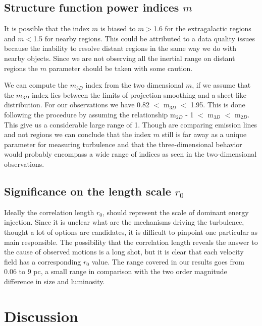 \documentclass[fleqn,usenatbib, useAMS, a4paper]{mnras}
\begin{document}
\subsection{Structure function power indices \(m\)}

It is possible that the index \(m\) is biased to \(m>\)1.6 for the extragalactic regions and \(m<\)1.5 for nearby regions.
This could be attributed to a data quality issues because the inability to resolve distant regions in the same way we do with nearby objects.
Since we are not observing all the inertial range on distant regions the \(m\) parameter  should be taken with some caution.

We can compute the $m_{3D}$ index from the two dimensional \(m\), if we assume that the $m_{3D}$ index lies between the limits of projection smoothing and a sheet-like distribution. 
For our observations we have 0.82 $<$ m$_{3D}$ $<$ 1.95.
This is done following the procedure by \cite{arthur2016turbulence} assuming the relationship m$_{2D}$ - 1 $<$ m$_{3D}$ $<$ m$_{2D}$.
This give us a considerable large range of 1. 
Though \cite{arthur2016turbulence} are comparing emission lines and not regions we can conclude that the index \(m\) still is far away as a unique parameter for measuring turbulence and that the three-dimensional behavior would probably encompass a wide range of indices as seen in the two-dimensional observations.


\subsection{Significance on the length scale \(r_0\)}

Ideally the correlation length \(r_0\), should represent the scale of dominant energy injection. 
Since it is unclear what are the mechanisms driving the turbulence, thought a lot of options are candidates, it is difficult to pinpoint one particular as main responsible. 
The possibility that the correlation length reveals the answer to the cause of observed motions is a long shot, but it is clear that each velocity field has a corresponding \(r_0\) value. 
The range covered in our results goes from 0.06 to 9 pc, a small range in comparison with the two order magnitude difference in size and luminosity.



\section{Discussion}\label{sec:discussion}
\end{document}
